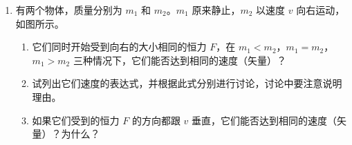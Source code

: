 \documentclass[\gkver]{gaokaozhenti}
\begin{document}
\begin{enumerate}
{（2）BC 间发生了断路。

理由：此时的等效电路如图所示，D 向右移动 $R_{1}$ 增大，AD 间的电阻 $R_{\mathrm{AD}}=\frac{R_{1}R_{3}}{R_{1}+R_{3}}$ 也增大，其中 $R_{3}=R+R_{G}$；$R_{G}$ 是电流计内电阻，同时 $R_{2}$ 减小。于是加在 AD 间的电压 $U_{\mathrm{AD}}=\frac{R_{\mathrm{AD}}E}{R_{\mathrm{AD}}+R_{2}}=\frac{E}{1+\frac{R_{2}}{R_{\mathrm{AD}}}}$


也增大，这就使流过电流计 G 的电流增大。

评分说明：全题 14 分。（1）8 分，（2）6 分。

（1）中，步骤①2 分，未写“按下 K”，或未写“按下 D，观察 G 中指针偏转方向”的，各扣 1 分；步骤②3 分，在按下 D 时未写“直到 G 的指针不偏转”的不给分，漏写按下 D 的，扣 1 分；步骤③1 分；步骤④2 分，未写 $R_{x}=\frac{l_{2}}{l_{1}}R$ 的，不给分。$l_{1}$，$l_{2}$ 用 AD、DC 表示也可以。如果步骤①的全部或部分内容与步骤②合并写出，不因此而扣分。

（2）中，写出断路位置，给 2 分，说明理由，给 4 分。理由的说明中，只写出 $R_{\mathrm{AD}}$ 随 D 的右移而增大的，给 2 分。用分压原理说明了随 D 的右移 AD 间的电压增大，因而流过 G 的电流增大的，给 4 分。说明理由中，只要基本点都已说到，无概念错误，但叙述层次不清、文句不够通顺的，这次考试暂不扣分，明显的概念错误可酌情扣分。
}

\item
有两个物体，质量分别为 $m_{1}$ 和 $m_{2}$。$m_{1}$ 原来静止，$m_{2}$ 以速度 $v$ 向右运动，如图所示。
\begin{enumerate}
	\item
	它们同时开始受到向右的大小相同的恒力 $F$，在 $m_{1}<m_{2}$，$m_{1}=m_{2}$，$m_{1}>m_{2}$ 三种情况下，它们能否达到相同的速度（矢量）？
	\item
	试列出它们速度的表达式，并根据此式分别进行讨论，讨论中要注意说明理由。
	\item
	如果它们受到的恒力 $F$ 的方向都跟 $v$ 垂直，它们能否达到相同的速度（矢量）？为什么？
\end{enumerate}
\onepicture[align=right, w=2.88cm]{}

\end{enumerate}
\end{document}
